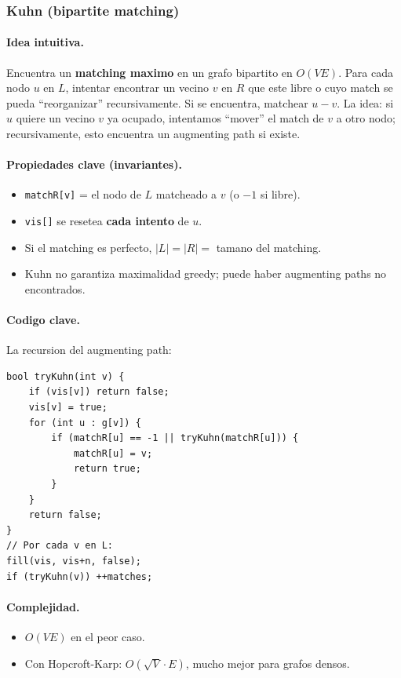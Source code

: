 ﻿\subsubsection{Kuhn (bipartite matching)}

\paragraph{Idea intuitiva.}
Encuentra un \textbf{matching maximo} en un grafo bipartito en $O(VE)$. Para cada nodo $u$ en $L$, intentar encontrar un vecino $v$ en $R$ que este libre o cuyo match se pueda ``reorganizar'' recursivamente. Si se encuentra, matchear $u - v$. La idea: si $u$ quiere un vecino $v$ ya ocupado, intentamos ``mover'' el match de $v$ a otro nodo; recursivamente, esto encuentra un augmenting path si existe.

\paragraph{Propiedades clave (invariantes).}
\begin{itemize}\setlength\itemsep{0pt}
	\item \texttt{matchR[v]} = el nodo de $L$ matcheado a $v$ (o $-1$ si libre).
	\item \texttt{vis[]} se resetea \textbf{cada intento} de $u$.
	\item Si el matching es perfecto, $|L| = |R| = $ tamano del matching.
	\item Kuhn no garantiza maximalidad greedy; puede haber augmenting paths no encontrados.
\end{itemize}

\paragraph{Codigo clave.}
La recursion del augmenting path:
\begin{verbatim}
bool tryKuhn(int v) {
    if (vis[v]) return false;
    vis[v] = true;
    for (int u : g[v]) {
        if (matchR[u] == -1 || tryKuhn(matchR[u])) {
            matchR[u] = v;
            return true;
        }
    }
    return false;
}
// Por cada v en L:
fill(vis, vis+n, false);
if (tryKuhn(v)) ++matches;
\end{verbatim}

\paragraph{Complejidad.}
\begin{itemize}\setlength\itemsep{0pt}
	\item $O(VE)$ en el peor caso.
	\item Con Hopcroft-Karp: $O(\sqrt{V} \cdot E)$, mucho mejor para grafos densos.
\end{itemize}

